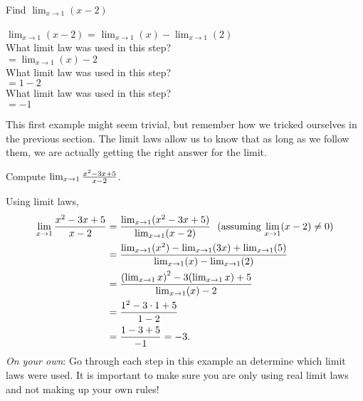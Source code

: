 \documentclass{ximera}
\begin{document}
\begin{example}
Find  $\lim_{x\to1}(x-2)$
\end{example}
\begin{solution}
$\lim_{x\to1}(x-2)$ = $\lim_{x\to1}(x)-\lim_{x\to1}(2)$ \\
What limit law was used in this step? \\
 $=\lim_{x\to1}(x)-2$ \\
What limit law was used in this step? \\
$=1-2$ \\
What limit law was used in this step? \\
$=-1$
\end{solution}

This first example might seem trivial, but remember how we tricked ourselves in the previous section.  The limit laws allow us to know that as long as we follow them, we are actually getting the right answer for the limit.

\begin{example}
Compute $\lim_{x\to 1}{x^2-3x+5\over x-2}$. 
\end{example}
\begin{solution}
Using limit laws, 
\begin{align*}
\lim_{x\to 1}{x^2-3x+5\over x-2}&=
\dfrac{\lim_{x\to 1}(x^2-3x+5)}{\lim_{x\to1}(x-2)}  \text{\ \ (assuming $\lim_{x\to1}(x-2) \neq 0$)} \\
&=\frac{\lim_{x\to 1}(x^2)-\lim_{x\to1}(3x)+\lim_{x\to1}(5)}{\lim_{x\to1}(x)-\lim_{x\to1}(2)} \\
&=\dfrac{\left(\lim_{x\to 1}x\right)^2-3(\lim_{x\to1}x)+5}{\lim_{x\to1}(x)-2} \\
&=\dfrac{1^2-3\cdot1+5}{1-2} \\
&=\dfrac{1-3+5}{-1} = -3.
\end{align*}
\textit{On your own}: Go through each step in this example an determine which limit laws were used.  It is important to make sure you are only using real limit laws and not making up your own rules!
\end{solution}
\end{document}
